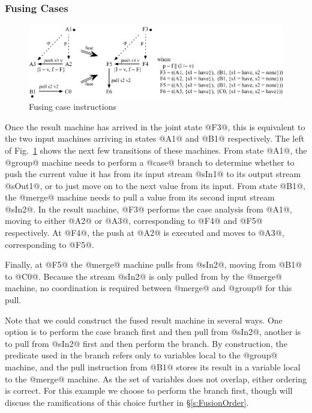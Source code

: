 \subsubsection{Fusing Cases}
\begin{figure}
\includegraphics[scale=1.1]{figures/fuse-case-pull.pdf}
\caption{Fusing case instructions}
\label{fig:Fusion:Case}
\end{figure}

Once the result machine has arrived in the joint state @F3@, this is equivalent to the two input machines arriving in states @A1@ and @B1@ respectively. The left of Fig.~\ref{fig:Fusion:Case} shows the next few transitions of these machines. From state @A1@, the @group@ machine needs to perform a @case@ branch to determine whether to push the current value it has from its input stream @sIn1@ to its output stream @sOut1@, or to just move on to the next value from its input. From state @B1@, the @merge@ machine needs to pull a value from its second input stream @sIn2@. In the result machine, @F3@ performs the case analysis from @A1@, moving to either @A2@ or @A3@, corresponding to @F4@ and @F5@ respectively. At @F4@, the push at @A2@ is executed and moves to @A3@, corresponding to @F5@.

Finally, at @F5@ the @merge@ machine pulls from @sIn2@, moving from @B1@ to @C0@.
Because the stream @sIn2@ is only pulled from by the @merge@ machine, no coordination is required between @merge@ and @group@ for this pull.

Note that we could construct the fused result machine in several ways. One option is to perform the case branch first and then pull from @sIn2@, another is to pull from @sIn2@ first and then perform the branch. By construction, the predicate used in the branch refers only to variables local to the @group@ machine, and the pull instruction from @B1@ stores its result in a variable local to the @merge@ machine. As the set of variables does not overlap, either ordering is correct. For this example we choose to perform the branch first, though will discuss the ramifications of this choice further in \S\ref{s:FusionOrder}. 


